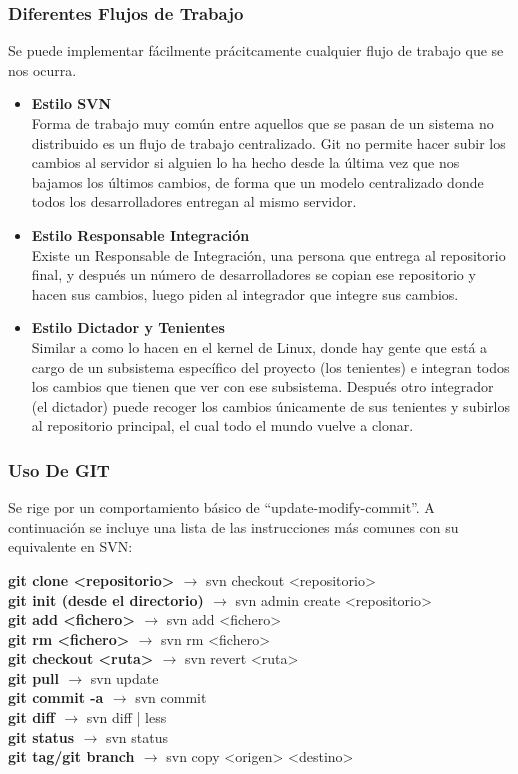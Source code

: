 \subsubsection{Diferentes Flujos de Trabajo}
Se puede implementar fácilmente prácitcamente cualquier flujo de trabajo que se nos ocurra.
\begin{itemize}
\item \textbf{Estilo SVN}\\
Forma de trabajo muy común entre aquellos que se pasan de un sistema no distribuido es un flujo de trabajo centralizado. 
Git no permite hacer subir los cambios al servidor si alguien lo ha hecho desde la última vez que nos bajamos los últimos cambios, 
de forma que un modelo centralizado donde todos los desarrolladores entregan al mismo servidor.
\item \textbf{Estilo Responsable Integración}\\
Existe un Responsable de Integración, una persona que entrega al repositorio final, y después un número de desarrolladores se copian 
ese repositorio y hacen sus cambios, luego piden al integrador que integre sus cambios.
\item \textbf{Estilo Dictador y Tenientes}\\
Similar a como lo hacen en el kernel de Linux, donde hay gente que está a cargo de un subsistema específico del proyecto (los tenientes)
e integran todos los cambios que tienen que ver con ese subsistema. Después otro integrador (el dictador) puede recoger los cambios
únicamente de sus tenientes y subirlos al repositorio principal, el cual todo el mundo vuelve a clonar. 
\end{itemize} 

\subsubsection{Uso De GIT}
Se rige por un comportamiento básico de “update-modify-commit”. A continuación se incluye una lista de las instrucciones más comunes 
con su equivalente en SVN:


\textbf{git clone <repositorio> $\rightarrow$} svn checkout <repositorio>\\
\textbf{git init (desde el directorio)  $\rightarrow$}    svn admin create <repositorio>\\
\textbf{git add <fichero>  $\rightarrow$ }  svn add <fichero>\\
\textbf{git rm <fichero>  $\rightarrow$  }  svn rm <fichero>\\
\textbf{git checkout <ruta> $\rightarrow$ }  svn revert <ruta>\\
\textbf{git pull  $\rightarrow$}    svn update\\
\textbf{git commit -a  $\rightarrow$ }   svn commit\\
\textbf{git diff  $\rightarrow$  }  svn diff | less\\
\textbf{git status  $\rightarrow$ }  svn status\\
\textbf{git tag/git branch  $\rightarrow$ }  svn copy <origen> <destino>\\

